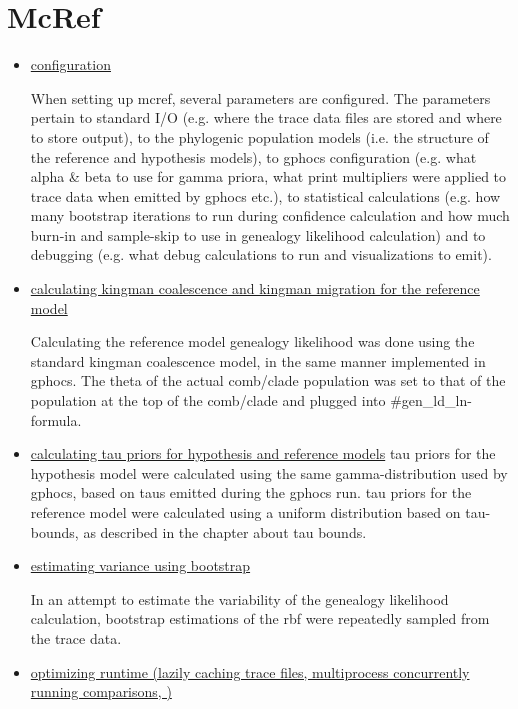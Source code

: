 \documentclass[11pt]{article}
\newcommand{\1}{\mathbbm{1}}
\begin{document}
\section{McRef}

\begin{itemize}
\item \underline{configuration}

When setting up mcref, several parameters are configured. The parameters pertain to standard I/O (e.g. where the trace data files are stored and where to store output), to the phylogenic population models (i.e. the structure of the reference and hypothesis models), to gphocs configuration (e.g. what alpha \& beta to use for gamma priora, what print multipliers were applied to trace data when emitted by gphocs etc.), to statistical calculations (e.g. how many bootstrap iterations to run during confidence calculation and how much burn-in and sample-skip to use in genealogy likelihood calculation) and to debugging (e.g. what debug calculations to run and visualizations to emit). 

\item \underline{calculating kingman coalescence and kingman migration for the reference model}

Calculating the reference model genealogy likelihood was done using the standard kingman coalescence model, in the same manner implemented in gphocs. The theta of the actual comb/clade population was set to that of the population at the top of the comb/clade and plugged into \#gen\_ld\_ln-formula. 

\item \underline{calculating tau priors for hypothesis and reference models}
tau priors for the hypothesis model were calculated using the same gamma-distribution used by gphocs, based on taus emitted during the gphocs run. tau priors for the reference model were calculated using a uniform distribution based on tau-bounds, as described in the chapter about tau bounds.

\item \underline{estimating variance using bootstrap}

In an attempt to estimate the variability of the genealogy likelihood calculation, bootstrap estimations of the rbf were repeatedly sampled from the trace data. 


\item \underline{optimizing runtime (lazily caching trace files, multiprocess concurrently running comparisons, )}


\end{itemize}
\end{document}
